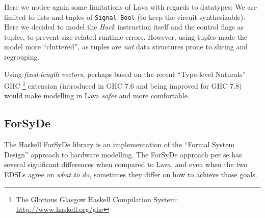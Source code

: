 \documentclass[a4paper]{article}
\begin{document}
                Here we notice again some limitations of Lava with regards to datatypes: We are
                limited to lists and tuples of \texttt{Signal Bool} (to keep the circuit
                synthesizable). Here we decided to model the \emph{Hack} instruction itself and
                the control flags as tuples, to prevent size-related runtime errors. However, using
                tuples made the model more ``cluttered'', as tuples are \emph{not} data structures
                prone to slicing and regrouping.

                Using \emph{fixed-length vectors}, perhaps based on the recent ``Type-level
                Naturals'' GHC
                \footnote{The Glorious Glasgow Haskell Compilation System:
                    \url{http://www.haskell.org/ghc}}
                extension \cite{website:ghc-typenats}
                (introduced in GHC 7.6 and being improved for GHC 7.8) would make modelling in Lava
                \emph{safer} and more comfortable.


        \subsection{ForSyDe}
        \label{subsec:forsyde}
            The Haskell ForSyDe library is an implementation of the ``Formal System Design''
            approach to hardware modelling\cite{forsyde1999}. The ForSyDe approach per se has
            several significant differences when compared to Lava, and even when the two EDSLs agree
            on \emph{what to do}, sometimes they differ on how to achieve those goals.
\end{document}
